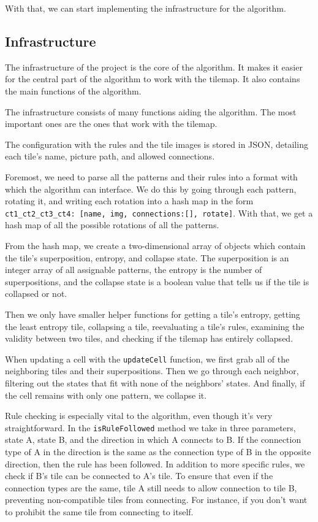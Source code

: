 \documentclass[10pt,oneside,a4paper]{article}
\begin{document}
With that, we can start implementing the infrastructure for the algorithm.

\subsection{Infrastructure}\label{sec:infrastructure}
The infrastructure of the project is the core of the algorithm.
It makes it easier for the central part of the algorithm to work with the tilemap.
It also contains the main functions of the algorithm.

The infrastructure consists of many functions aiding the algorithm.
The most important ones are the ones that work with the tilemap.

The configuration with the rules and the tile images is stored in JSON, detailing each tile's name, picture path, and allowed connections.

Foremost, we need to parse all the patterns and their rules into a format with which the algorithm can interface.
We do this by going through each pattern, rotating it, and writing each rotation into a hash map in the form \texttt{ct1\_ct2\_ct3\_ct4: [name, img, connections:[], rotate]}. 
With that, we get a hash map of all the possible rotations of all the patterns.

From the hash map, we create a two-dimensional array of objects which contain the tile's superposition, entropy, and collapse state.
The superposition is an integer array of all assignable patterns, the entropy is the number of superpositions, and the collapse state is a boolean value that tells us if the tile is collapsed or not.

Then we only have smaller helper functions for getting a tile's entropy, getting the least entropy tile, collapsing a tile, reevaluating a tile's rules, examining the validity between two tiles, and checking if the tilemap has entirely collapsed.

When updating a cell with the \texttt{updateCell} function, we first grab all of the neighboring tiles and their superpositions.
Then we go through each neighbor, filtering out the states that fit with none of the neighbors' states.
And finally, if the cell remains with only one pattern, we collapse it.

Rule checking is especially vital to the algorithm, even though it's very straightforward.
In the \texttt{isRuleFollowed} method we take in three parameters, state A, state B, and the direction in which A connects to B.
If the connection type of A in the direction is the same as the connection type of B in the opposite direction, then the rule has been followed.
In addition to more specific rules, we check if B's tile can be connected to A's tile.
To ensure that even if the connection types are the same, tile A still needs to allow connection to tile B, preventing non-compatible tiles from connecting. For instance, if you don't want to prohibit the same tile from connecting to itself.
\end{document}
